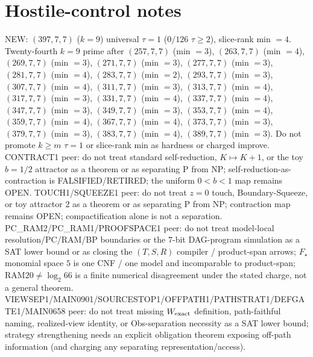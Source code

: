 \documentclass[11pt]{article}
\begin{document}
\section*{Hostile-control notes}
NEW: $(397,7,7)$ ($k{=}9$) universal $\tau{=}1$ ($0/126$ $\tau{\ge}2$), slice-rank min $=4$.
Twenty-fourth $k{=}9$ prime after $(257,7,7)$ (min $=3$), $(263,7,7)$ (min $=4$), $(269,7,7)$ (min $=3$), $(271,7,7)$ (min $=3$), $(277,7,7)$ (min $=3$), $(281,7,7)$ (min $=4$), $(283,7,7)$ (min $=2$), $(293,7,7)$ (min $=3$), $(307,7,7)$ (min $=4$), $(311,7,7)$ (min $=3$), $(313,7,7)$ (min $=4$), $(317,7,7)$ (min $=3$), $(331,7,7)$ (min $=4$), $(337,7,7)$ (min $=4$), $(347,7,7)$ (min $=3$), $(349,7,7)$ (min $=3$), $(353,7,7)$ (min $=4$), $(359,7,7)$ (min $=4$), $(367,7,7)$ (min $=4$), $(373,7,7)$ (min $=3$), $(379,7,7)$ (min $=3$), $(383,7,7)$ (min $=4$), $(389,7,7)$ (min $=3$).
Do not promote $k{\ge}m$ $\tau{=}1$ or slice-rank min as hardness or charged improve.
CONTRACT1 peer: do not treat standard self-reduction, $K\mapsto K+1$, or the toy $b{=}1/2$ attractor as a theorem or as separating P from NP;
self-reduction-as-contraction is FALSIFIED/RETIRED; the uniform $0{<}b{<}1$ map remains OPEN.
TOUCH1/SQUEEZE1 peer: do not treat $z{=}0$ touch, Boundary-Squeeze, or toy attractor $2$ as a theorem or as separating P from NP;
contraction map remains OPEN; compactification alone is not a separation.
PC\_RAM2/PC\_RAM1/PROOFSPACE1 peer: do not treat model-local resolution/PC/RAM/BP boundaries or the $7$-bit DAG-program simulation as a SAT lower bound
or as closing the $(T,S,R)$ compiler / product-span arrows; $F_\star$ monomial space $5$ is one CNF / one model and incomparable to product-span;
RAM$20\neq\log_2 66$ is a finite numerical disagreement under the stated charge, not a general theorem.
VIEWSEP1/MAIN0901/SOURCESTOP1/OFFPATH1/PATHSTRAT1/DEFGATE1/MAIN0658 peer: do not treat missing $W_{\rm exact}$ definition,
path-faithful naming, realized-view identity, or Obs-separation necessity as a SAT lower bound;
strategy strengthening needs an explicit obligation theorem exposing off-path information
(and charging any separating representation/access).
\end{document}
